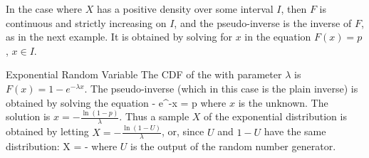 In the case where
$X$ has a positive density over some interval $I$, then $F$ is
continuous and strictly increasing on $I$, and the
pseudo-inverse is the inverse of $F$, as in the next example.
It is obtained by solving for $x$ in the equation $F(x)=p$,
$x\in I$.
\begin{ex}{Exponential Random Variable}
The CDF of the  with parameter
$\lambda$ is $F(x)=1- e^{-\lambda x}$. The pseudo-inverse
(which in this case is the plain inverse) is obtained by
solving the equation - e^{-\lambda x} = p \een where $x$
is the unknown. The solution is $x=- \frac{\ln
(1-p)}{\lambda}$. Thus a sample $X$ of the exponential
distribution is obtained by letting $X = - \frac{\ln
(1-U)}{\lambda}$, or, since $U$ and $1-U$ have the same
distribution:
  \be
X = - 
  \ee
  where $U$ is the output of the random number generator.
\end{ex}

